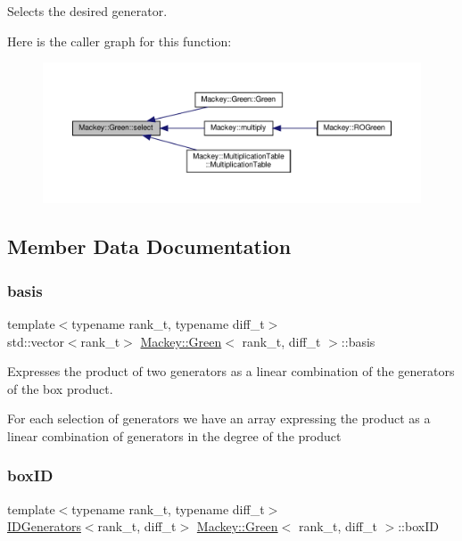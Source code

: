 Selects the desired generator. 

Here is the caller graph for this function\+:\nopagebreak
\begin{figure}[H]
\begin{center}
\leavevmode
\includegraphics[width=350pt]{classMackey_1_1Green_a094a394ff8e1f4801fb3a5f09e071def_icgraph}
\end{center}
\end{figure}


\subsection{Member Data Documentation}
\mbox{\label{classMackey_1_1Green_a9cfc633ccb548d2d516450399c108174}} 
\subsubsection{\texorpdfstring{basis}{basis}}
{\footnotesize\ttfamily template$<$typename rank\+\_\+t, typename diff\+\_\+t$>$ \\
std\+::vector$<$rank\+\_\+t$>$ \hyperlink{classMackey_1_1Green}{Mackey\+::\+Green}$<$ rank\+\_\+t, diff\+\_\+t $>$\+::basis}



Expresses the product of two generators as a linear combination of the generators of the box product. 

For each selection of generators we have an array expressing the product as a linear combination of generators in the degree of the product \mbox{\label{classMackey_1_1Green_a3ced169c915348d6b0f3f178c6b2d7ff}} 
\subsubsection{\texorpdfstring{box\+ID}{boxID}}
{\footnotesize\ttfamily template$<$typename rank\+\_\+t, typename diff\+\_\+t$>$ \\
\hyperlink{classMackey_1_1IDGenerators}{I\+D\+Generators}$<$rank\+\_\+t, diff\+\_\+t$>$ \hyperlink{classMackey_1_1Green}{Mackey\+::\+Green}$<$ rank\+\_\+t, diff\+\_\+t $>$\+::box\+ID}



